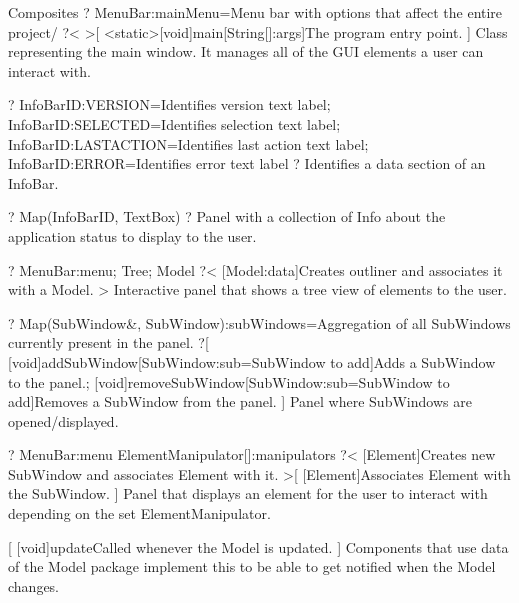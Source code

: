 \newpage
\begin{package}{Composites}
    ?
        MenuBar:mainMenu=Menu bar with options that affect the entire project/
    ?<
    >[
        \func{+}<static>[void]{main}[String[]:args]{The program entry point.}
    ]{
        Class representing the main window. It manages all of the GUI elements a user can interact with.
    }

    ?
            InfoBarID:VERSION=Identifies version text label;
            InfoBarID:SELECTED=Identifies selection text label;
            InfoBarID:LASTACTION=Identifies last action text label;
            InfoBarID:ERROR=Identifies error text label
        ?{
            Identifies a data section of an InfoBar.
        }

    ?
        Map(InfoBarID, TextBox)
        ?{
            Panel with a collection of Info about the application status to display to the user.
        }

    ?
            MenuBar:menu;
            Tree;
            Model
        ?<
            [Model:data]{Creates outliner and associates it with a Model.}
        >{
            Interactive panel that shows a tree view of elements to the user.
        }

    ?
        Map(SubWindow\&, SubWindow):subWindows=Aggregation of all SubWindows currently present in the panel.
    ?[
        \func{+}[void]{addSubWindow}[SubWindow:sub=SubWindow to add]{Adds a SubWindow to the panel.};
        \func{+}[void]{removeSubWindow}[SubWindow:sub=SubWindow to add]{Removes a SubWindow from the panel.}
    ]{
        Panel where SubWindows are opened/displayed.
    }

    ?
        MenuBar:menu
        ElementManipulator[]:manipulators
    ?<
        [Element]{Creates new SubWindow and associates Element with it.}
    >[
        [Element]{Associates Element with the SubWindow.}
    ]{
        Panel that displays an element for the user to interact with depending on the set ElementManipulator.
    }

    [
        \func{+}[void]{update}{Called whenever the Model is updated.}
    ]{
        Components that use data of the Model package implement this to be able to get notified when the Model changes.
    }


\end{package}
